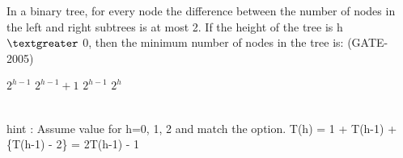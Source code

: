 \begin{questyle}
  \question  In a binary tree, for every node the difference between the number of nodes in the left and right subtrees is at most 2. If the height of the tree is h \( \textgreater \) 0, then the minimum number of nodes in the tree is:  (GATE-2005)

  \begin{oneparchoices}
    \choice         \(2^{h-1} \)
    \CorrectChoice  \(2^{h-1} + 1 \)
    \choice         \(2^{h-1} \)
    \choice         \(2^{h} \)
  \end{oneparchoices} \\
  hint : Assume value for h=0, 1, 2 and match the option. T(h) = 1 + T(h-1) + \{T(h-1) - 2\} = 2T(h-1) - 1
\end{questyle}



